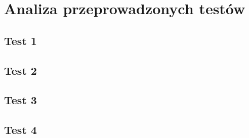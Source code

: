 \chapter{Analiza przeprowadzonych testów}
	\section{Test 1}
	\section{Test 2}
	\section{Test 3}
	\section{Test 4}
